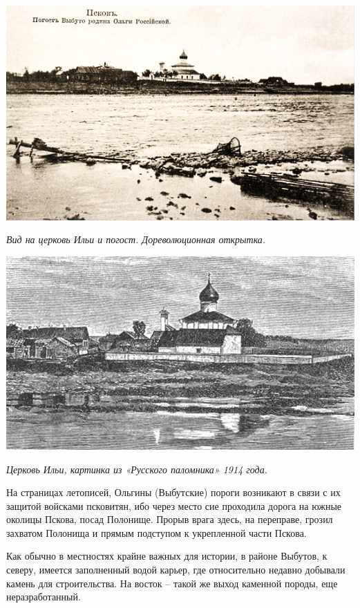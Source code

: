 \begin{center}
\includegraphics[width=\linewidth]{chast-volga/vybuty/olga02.jpg}

\textit{Вид на церковь Ильи и погост. Дореволюционная открытка.}
\end{center}

\newpage

\begin{center}
\includegraphics[width=\linewidth]{chast-volga/vybuty/vybuty-01.jpg}

\textit{Церковь Ильи, картинка из «Русского паломника» 1914 года.}
\end{center}

На страницах летописей, Ольгины (Выбутские) пороги возникают в связи с их защитой войсками псковитян, ибо через место сие проходила дорога на южные околицы Пскова, посад Полонище. Прорыв врага здесь, на переправе, грозил захватом Полонища и прямым подступом к укрепленной части Пскова.

Как обычно в местностях крайне важных для истории, в районе Выбутов, к северу, имеется заполненный водой карьер, где относительно недавно добывали камень для строительства. На восток – такой же выход каменной породы, еще неразработанный. 

